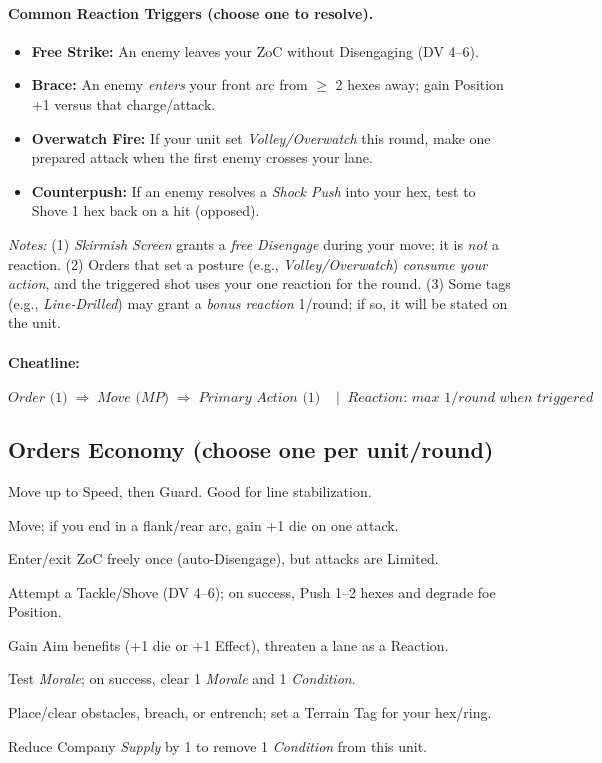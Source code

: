 \documentclass[11pt]{article}
\begin{document}
\paragraph{Common Reaction Triggers (choose one to resolve).}
\begin{itemize}[leftmargin=*]
  \item \textbf{Free Strike:} An enemy leaves your ZoC without Disengaging (DV 4--6).
  \item \textbf{Brace:} An enemy \emph{enters} your front arc from \(\ge\) 2 hexes away; gain Position +1 versus that charge/attack.
  \item \textbf{Overwatch Fire:} If your unit set \textit{Volley/Overwatch} this round, make one prepared attack when the first enemy crosses your lane.
  \item \textbf{Counterpush:} If an enemy resolves a \textit{Shock Push} into your hex, test to Shove 1 hex back on a hit (opposed).
\end{itemize}
\textit{Notes:} (1) \textit{Skirmish Screen} grants a \emph{free Disengage} during your move; it is \emph{not} a reaction. (2) Orders that set a posture (e.g., \textit{Volley/Overwatch}) \emph{consume your action}, and the triggered shot uses your one reaction for the round. (3) Some tags (e.g., \textit{Line-Drilled}) may grant a \emph{bonus reaction} 1/round; if so, it will be stated on the unit.

\paragraph{Cheatline:}
\[
\textit{Order (1)} \;\Rightarrow\; \textit{Move (MP)} \;\Rightarrow\; \textit{Primary Action (1)} \;\;\;\; \big|\;\; \textit{Reaction: max 1/round when triggered}
\]

\subsection{Orders Economy (choose one per unit/round)}
\begin{description}[leftmargin=*,style=nextline]
  \item[Advance \& Hold] Move up to Speed, then Guard. Good for line stabilization.
  \item[Flank \& Strike] Move; if you end in a flank/rear arc, gain +1 die on one attack.
  \item[Skirmish Screen] Enter/exit ZoC freely once (auto-Disengage), but attacks are Limited.
  \item[Shock Push] Attempt a Tackle/Shove (DV 4--6); on success, Push 1--2 hexes and degrade foe Position.
  \item[Volley/Overwatch] Gain Aim benefits (+1 die or +1 Effect), threaten a lane as a Reaction.
  \item[Rally \& Reform] Test \emph{Morale}; on success, clear 1 \emph{Morale} and 1 \emph{Condition}.
  \item[Sapper Work] Place/clear obstacles, breach, or entrench; set a Terrain Tag for your hex/ring.
  \item[Logistics Action] Reduce Company \emph{Supply} by 1 to remove 1 \emph{Condition} from this unit.
\end{description}
\end{document}
